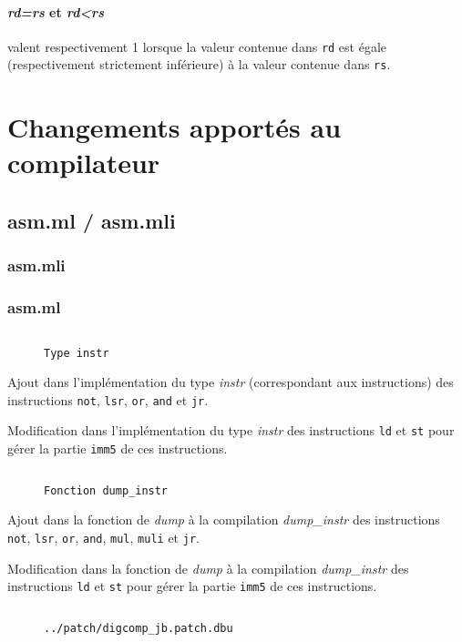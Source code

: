 \documentclass[twoside, 12pt, a4paper]{article}
\newcommand{\fmo}[4]{
\begin{figure}[!h]
    \centering
    \inputminted[firstline=#3, lastline=#4]{ocaml}{#1}
    \caption{\texttt{#2}}
\end{figure}
}
\begin{document}
\paragraph{\textit{rd=rs} et \textit{rd<rs}} valent respectivement 1 lorsque la valeur contenue dans \texttt{rd} est égale (respectivement strictement inférieure) à la valeur contenue dans \texttt{rs}. 

\clearpage

\section{Changements apportés au compilateur}

\subsection{asm.ml / asm.mli}

\subsubsection{asm.mli}

\subsubsection{asm.ml}

\fmo{../patch/digcomp_jb.patch.dbu}{Type instr}{5}{25}

Ajout dans l'implémentation du type \textit{instr} (correspondant aux instructions) des instructions \texttt{not}, \texttt{lsr}, \texttt{or}, \texttt{and} et \texttt{jr}.

Modification dans l'implémentation du type \textit{instr} des instructions \texttt{ld} et \texttt{st} pour gérer la partie \texttt{imm5} de ces instructions.

\clearpage

\fmo{../patch/digcomp_jb.patch.dbu}{Fonction dump\_instr}{26}{56}

Ajout dans la fonction de \textit{dump} à la compilation \textit{dump\_instr} des instructions \texttt{not}, \texttt{lsr}, \texttt{or}, \texttt{and}, \texttt{mul}, \texttt{muli} et \texttt{jr}.

Modification dans la fonction de \textit{dump} à la compilation \textit{dump\_instr} des instructions \texttt{ld} et \texttt{st} pour gérer la partie \texttt{imm5} de ces instructions.

\clearpage

\fmo{../patch/digcomp_jb.patch.dbu}{../patch/digcomp\_jb.patch.dbu}{57}{104}
\end{document}
